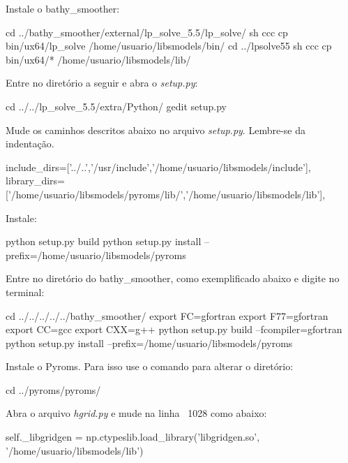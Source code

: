 \noindent Instale o bathy\_smoother:
\bigskip

\begin{bashcode}
cd ../bathy_smoother/external/lp_solve_5.5/lp_solve/
sh ccc
cp bin/ux64/lp_solve /home/usuario/libsmodels/bin/
cd ../lpsolve55
sh ccc
cp bin/ux64/* /home/usuario/libsmodels/lib/
\end{bashcode}
\bigskip

\noindent Entre no diretório a seguir e abra o \textit{setup.py}:
\bigskip

\begin{bashcode}
cd ../../lp_solve_5.5/extra/Python/
gedit setup.py
\end{bashcode}
\bigskip

\noindent Mude os caminhos descritos abaixo no arquivo \textit{setup.py}. Lembre-se da indentação.
\bigskip

\begin{bashcode}[fontsize=\scriptsize]
include_dirs=['../..','/usr/include','/home/usuario/libsmodels/include'],
library_dirs=['/home/usuario/libsmodels/pyroms/lib/','/home/usuario/libsmodels/lib'],
\end{bashcode}
\bigskip

\noindent Instale:
\bigskip

\begin{bashcode}
python setup.py build
python setup.py install --prefix=/home/usuario/libsmodels/pyroms
\end{bashcode}
\bigskip

\noindent Entre no diretório do bathy\_smoother, como exemplificado abaixo e digite no terminal:
\bigskip

\begin{bashcode}
cd ../../../../../bathy_smoother/
export FC=gfortran
export F77=gfortran
export CC=gcc
export CXX=g++
python setup.py build --fcompiler=gfortran
python setup.py install --prefix=/home/usuario/libsmodels/pyroms
\end{bashcode}
\bigskip

\noindent Instale o Pyroms. Para isso use o comando para alterar o diretório:
\bigskip

\begin{bashcode}
cd ../pyroms/pyroms/
\end{bashcode}
\bigskip

\noindent Abra o arquivo \textit{hgrid.py} e mude na linha ~1028 como abaixo:
\bigskip

\begin{bashcode}[fontsize=\scriptsize]
self._libgridgen = np.ctypeslib.load_library('libgridgen.so', '/home/usuario/libsmodels/lib')
\end{bashcode}
\bigskip

